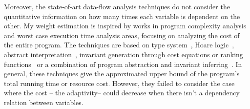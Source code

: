 %
%
%
Moreover, the state-of-art data-flow analysis techniques do not
consider the quantitative information on how many times each variable is dependent on the other. 
My weight estimation is inspired by
 works in program complexity analysis and worst case execution time analysis areas, 
 focusing on analyzing the cost of the entire program. 
The techniques are based on
type system~\cite{CicekBG0H17, RajaniG0021}, Hoare logic~\cite{CarbonneauxHS15}, abstract interpretation~\cite{GustafssonEL05, HumenbergerJK18},
invariant generation through cost equations or ranking functions~\cite{BrockschmidtEFFG16,AlbertAGP08,AliasDFG10,Flores-MontoyaH14}
or a combination of program abstraction and invariant inferring~\cite{GulwaniZ10, SinnZV17,GulwaniJK09}.
In general, these techniques give the approximated upper bound of the program's total running time or resource cost.
However, they failed to consider the case where the cost -- the adaptivity-- could decrease when there isn't a dependency relation between variables.

